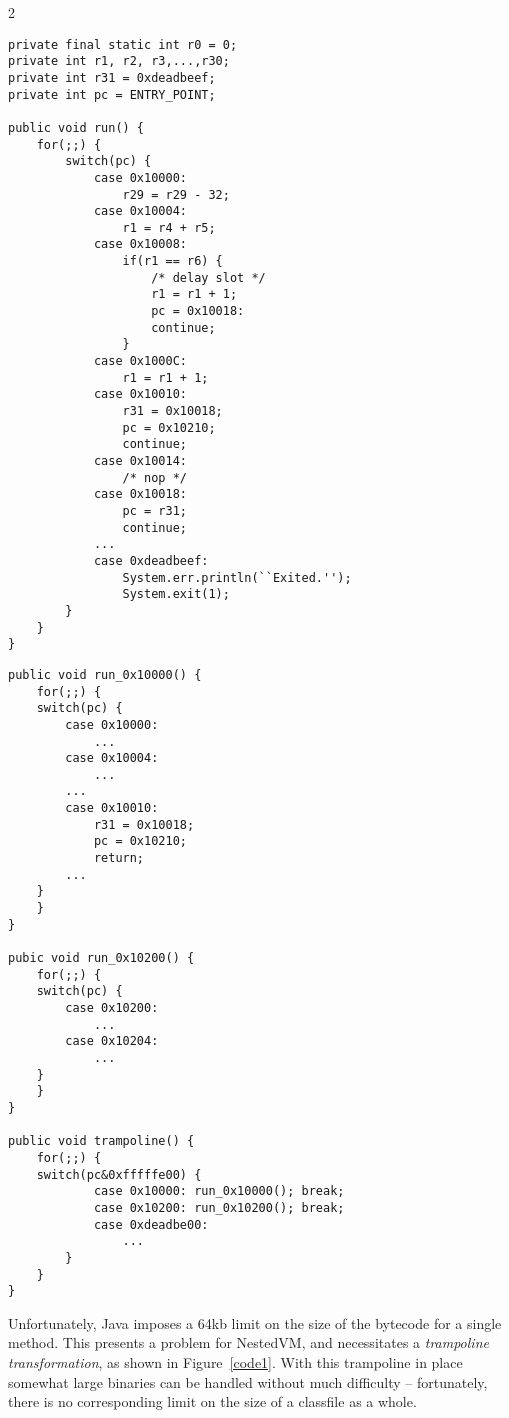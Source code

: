 \documentclass{acmconf}
\begin{document}
\begin{figure*}[t]
\begin{minipage}[c]{7in}%
\begin{multicols}{2}
{\footnotesize\begin{verbatim}
private final static int r0 = 0;
private int r1, r2, r3,...,r30;
private int r31 = 0xdeadbeef;
private int pc = ENTRY_POINT;

public void run() {
    for(;;) {
        switch(pc) {
            case 0x10000:
                r29 = r29 - 32;
            case 0x10004:
                r1 = r4 + r5;
            case 0x10008:
                if(r1 == r6) {
                    /* delay slot */
                    r1 = r1 + 1;
                    pc = 0x10018:
                    continue;
                }
            case 0x1000C:
                r1 = r1 + 1;
            case 0x10010:
                r31 = 0x10018;
                pc = 0x10210;
                continue;
            case 0x10014:
                /* nop */
            case 0x10018:
                pc = r31;
                continue;
            ...
            case 0xdeadbeef:
                System.err.println(``Exited.'');
                System.exit(1);
        }
    }
}
\end{verbatim}}
\vspace{1in}
{\footnotesize\begin{verbatim}
public void run_0x10000() {
    for(;;) {
    switch(pc) {
        case 0x10000:
            ...
        case 0x10004:
            ...
        ...
        case 0x10010:
            r31 = 0x10018;
            pc = 0x10210;
            return;
        ...
    }
    }
}

pubic void run_0x10200() {
    for(;;) {
    switch(pc) {
        case 0x10200:
            ...
        case 0x10204:
            ...
    }
    }
}

public void trampoline() {
    for(;;) {
    switch(pc&0xfffffe00) {
            case 0x10000: run_0x10000(); break;
            case 0x10200: run_0x10200(); break;
            case 0xdeadbe00:
                ...
        }
    }
}
\end{verbatim}}
\end{multicols}
\end{minipage}
\caption{\label{code1} Trampoline transformation necessitated by Java's 64kb method size limit}
\end{figure*}

Unfortunately, Java imposes a 64kb limit on the size of the bytecode
for a single method.  This presents a problem for NestedVM, and
necessitates a {\it trampoline transformation}, as shown in
Figure~\ref{code1}.  With this trampoline in place somewhat large
binaries can be handled without much difficulty -- fortunately, there
is no corresponding limit on the size of a classfile as a whole.
\end{document}
